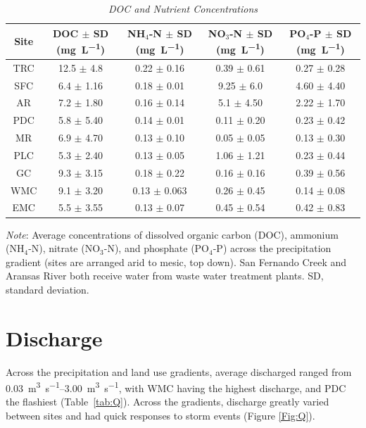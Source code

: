\begin{table}[htb]
\caption[DOC and Nutrient Concentrations]{\textit{DOC and Nutrient Concentrations}}
\begin{center}
\begin{tabular}
[c]{ccccc}\hline
Site & \makecell {DOC $\pm$ SD\\(\unit{\mg\per\L})} & \makecell {NH$_4$-N $\pm$ SD\\(\unit{\mg\per\L})} & \makecell {NO$_3$-N $\pm$ SD\\(\unit{\mg\per\L})} & \makecell {PO$_4$-P $\pm$ SD\\(\unit{\mg\per\L})}\\\hline
TRC & 12.5 $\pm$ 4.8 & 0.22 $\pm$ 0.16 & 0.39 $\pm$ 0.61 & 0.27 $\pm$ 0.28\\
SFC & 6.4 $\pm$ 1.16 & 0.18 $\pm$ 0.01 & 9.25 $\pm$ 6.0 & 4.60 $\pm$ 4.40\\
AR & 7.2 $\pm$ 1.80 &0.16 $\pm$ 0.14 & 5.1 $\pm$ 4.50 & 2.22 $\pm$ 1.70\\
PDC & 5.8 $\pm$ 5.40 & 0.14 $\pm$ 0.01 & 0.11 $\pm$ 0.20 & 0.23 $\pm$ 0.42\\
MR & 6.9 $\pm$ 4.70 & 0.13 $\pm$ 0.10 & 0.05 $\pm$ 0.05 & 0.13 $\pm$ 0.30\\
PLC	 & 5.3 $\pm$ 2.40 & 0.13 $\pm$ 0.05 & 1.06 $\pm$ 1.21 & 0.23 $\pm$ 0.44\\
GC & 9.3 $\pm$ 3.15 & 0.18 $\pm$ 0.22 & 0.16 $\pm$ 0.16 & 0.39 $\pm$ 0.56\\
WMC & 9.1 $\pm$ 3.20 & 0.13 $\pm$ 0.063 & 0.26 $\pm$ 0.45 & 0.14 $\pm$ 0.08\\
EMC & 5.5 $\pm$ 3.55 & 0.13 $\pm$ 0.07 & 0.45 $\pm$ 0.54 & 0.42 $\pm$ 0.83\\\hline
\end{tabular}
\end{center}
\textit{Note}: Average concentrations of dissolved organic carbon (DOC), ammonium (NH$_4$-N), nitrate (NO$_3$-N), and phosphate (PO$_4$-P) across the precipitation gradient (sites are arranged arid to mesic, top down). San Fernando Creek and Aransas River both receive water from waste water treatment plants. SD, standard deviation.
\label{tab: Nutrients}
\end{table}

\section{Discharge}

Across the precipitation and land use gradients, average discharged ranged from \qtyrange{.03}{3.00}{\cubic\m\per\second}, with WMC having the highest discharge, and PDC the flashiest (Table~\ref{tab:Q}). Across the gradients, discharge greatly varied between sites and had quick responses to storm events (Figure \ref{Fig:Q}).

